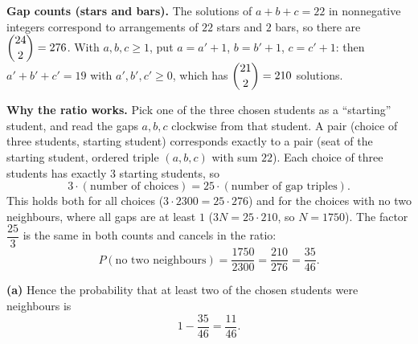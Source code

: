 \textbf{Gap counts (stars and bars).} The solutions of $a+b+c=22$ in nonnegative integers correspond to arrangements of $22$ stars and $2$ bars, so there are $\dbinom{24}{2}=276$. With $a,b,c\ge1$, put $a=a'+1$, $b=b'+1$, $c=c'+1$: then $a'+b'+c'=19$ with $a',b',c'\ge0$, which has $\dbinom{21}{2}=210$ solutions.

\textbf{Why the ratio works.} Pick one of the three chosen students as a ``starting'' student, and read the gaps $a,b,c$ clockwise from that student. A pair (choice of three students, starting student) corresponds exactly to a pair (seat of the starting student, ordered triple $(a,b,c)$ with sum $22$). Each choice of three students has exactly $3$ starting students, so
\[3\cdot(\text{number of choices})=25\cdot(\text{number of gap triples}).\]
This holds both for all choices ($3\cdot2300=25\cdot276$) and for the choices with no two neighbours, where all gaps are at least $1$ ($3N=25\cdot210$, so $N=1750$). The factor $\dfrac{25}{3}$ is the same in both counts and cancels in the ratio:
\[P(\text{no two neighbours})=\dfrac{1750}{2300}=\dfrac{210}{276}=\dfrac{35}{46}.\]

\textbf{(a)} Hence the probability that at least two of the chosen students were neighbours is
\[1-\dfrac{35}{46}=\boxed{\dfrac{11}{46}}.\]

